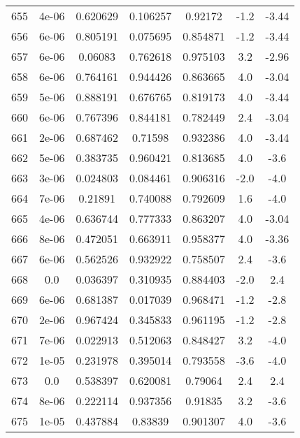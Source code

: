 \begin{table}
\begin{tabular}{c|c|c|c|c|c|c}
655 & 4e-06 & 0.620629 & 0.106257 & 0.92172 & -1.2 & -3.44\\
656 & 6e-06 & 0.805191 & 0.075695 & 0.854871 & -1.2 & -3.44\\
657 & 6e-06 & 0.06083 & 0.762618 & 0.975103 & 3.2 & -2.96\\
658 & 6e-06 & 0.764161 & 0.944426 & 0.863665 & 4.0 & -3.04\\
659 & 5e-06 & 0.888191 & 0.676765 & 0.819173 & 4.0 & -3.44\\
660 & 6e-06 & 0.767396 & 0.844181 & 0.782449 & 2.4 & -3.04\\
661 & 2e-06 & 0.687462 & 0.71598 & 0.932386 & 4.0 & -3.44\\
662 & 5e-06 & 0.383735 & 0.960421 & 0.813685 & 4.0 & -3.6\\
663 & 3e-06 & 0.024803 & 0.084461 & 0.906316 & -2.0 & -4.0\\
664 & 7e-06 & 0.21891 & 0.740088 & 0.792609 & 1.6 & -4.0\\
665 & 4e-06 & 0.636744 & 0.777333 & 0.863207 & 4.0 & -3.04\\
666 & 8e-06 & 0.472051 & 0.663911 & 0.958377 & 4.0 & -3.36\\
667 & 6e-06 & 0.562526 & 0.932922 & 0.758507 & 2.4 & -3.6\\
668 & 0.0 & 0.036397 & 0.310935 & 0.884403 & -2.0 & 2.4\\
669 & 6e-06 & 0.681387 & 0.017039 & 0.968471 & -1.2 & -2.8\\
670 & 2e-06 & 0.967424 & 0.345833 & 0.961195 & -1.2 & -2.8\\
671 & 7e-06 & 0.022913 & 0.512063 & 0.848427 & 3.2 & -4.0\\
672 & 1e-05 & 0.231978 & 0.395014 & 0.793558 & -3.6 & -4.0\\
673 & 0.0 & 0.538397 & 0.620081 & 0.79064 & 2.4 & 2.4\\
674 & 8e-06 & 0.222114 & 0.937356 & 0.91835 & 3.2 & -3.6\\
675 & 1e-05 & 0.437884 & 0.83839 & 0.901307 & 4.0 & -3.6\\
\end{tabular}
\end{table}
\newpage
